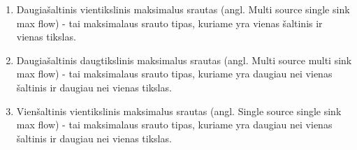 \begin{enumerate}
	\item Daugiašaltinis vientikslinis maksimalus srautas (angl. Multi source single sink max flow) - tai maksimalaus srauto tipas, kuriame yra vienas šaltinis ir vienas tikslas.
	\item Daugiašaltinis daugtikslinis maksimalus srautas (angl. Multi source multi sink max flow) - tai maksimalaus srauto tipas, kuriame yra daugiau nei vienas šaltinis ir daugiau nei vienas tikslas.
	\item Vienšaltinis vientikslinis maksimalus srautas (angl. Single source single sink max flow) - tai maksimalaus srauto tipas, kuriame yra daugiau nei vienas šaltinis ir daugiau nei vienas tikslas.
\end{enumerate}